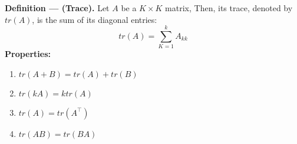 \documentclass{article}
\begin{document}
\begin{tcolorbox}[enhanced,breakable,sharp corners, colback=purple!5!white, colframe=purple!55!black, boxrule=0mm,top=0mm,bottom=0mm,leftrule=1mm, drop shadow=black!40!white]
    {\color{purple!55!black} \textbf{Definition --- (Trace).}}
    Let $A$ be a $K \times K$ matrix, Then, its trace, denoted by $tr(A)$, is the sum of its diagonal entries:
    $$tr(A) = \sum^k_{K=1}A_{kk}$$
    \textbf{Properties:}
    \begin{enumerate}
        \item $tr(A+B) = tr(A) + tr(B)$
        \item $tr(kA) = ktr(A)$
        \item $tr(A) = tr(A^\top)$
        \item $tr(AB) = tr(BA)$
    \end{enumerate}
\end{tcolorbox}

\newpage
\end{document}
